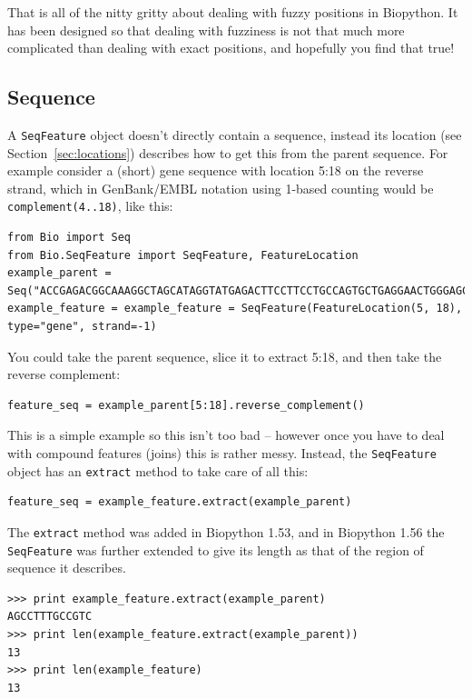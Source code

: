 \documentclass{report}
\begin{document}
That is all of the nitty gritty about dealing with fuzzy positions in Biopython. It has been designed so that dealing with fuzziness is not that much more complicated than dealing with exact positions, and hopefully you find that true!

\subsection{Sequence}

A \verb|SeqFeature| object doesn't directly contain a sequence, instead its location (see Section~\ref{sec:locations}) describes how to get this from the parent sequence. For example consider a (short) gene sequence with location 5:18 on the reverse strand, which in GenBank/EMBL notation using 1-based counting would be \texttt{complement(4..18)}, like this:

\begin{verbatim}
from Bio import Seq
from Bio.SeqFeature import SeqFeature, FeatureLocation
example_parent = Seq("ACCGAGACGGCAAAGGCTAGCATAGGTATGAGACTTCCTTCCTGCCAGTGCTGAGGAACTGGGAGCCTAC")
example_feature = example_feature = SeqFeature(FeatureLocation(5, 18), type="gene", strand=-1)
\end{verbatim}

You could take the parent sequence, slice it to extract 5:18, and then take the reverse complement:

\begin{verbatim}
feature_seq = example_parent[5:18].reverse_complement()
\end{verbatim}

This is a simple example so this isn't too bad -- however once you have to deal with compound features (joins) this is rather messy. Instead, the \verb|SeqFeature| object has an \verb|extract| method to take care of all this:

\begin{verbatim}
feature_seq = example_feature.extract(example_parent)
\end{verbatim}

The \verb|extract| method was added in Biopython 1.53, and in Biopython 1.56 the \verb|SeqFeature| was further extended to give its length as that of the region of sequence it describes.

\begin{verbatim}
>>> print example_feature.extract(example_parent)
AGCCTTTGCCGTC
>>> print len(example_feature.extract(example_parent))
13
>>> print len(example_feature)
13
\end{verbatim}
\end{document}
